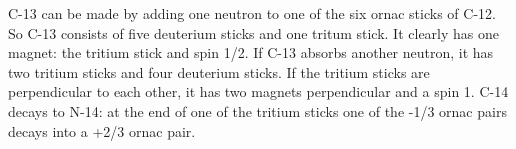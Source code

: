C-13 can be made by adding one neutron to one of the six ornac sticks of C-12. So C-13 consists of five deuterium sticks and one tritum stick. It clearly has one magnet: the tritium stick and spin 1/2. If C-13 absorbs another neutron, it has two tritium sticks and four deuterium sticks. If the tritium sticks are perpendicular to each other, it has two magnets perpendicular and a spin 1. C-14 decays to N-14: at the end of one of the tritium sticks one of the -1/3 ornac pairs decays into a +2/3 ornac pair.


